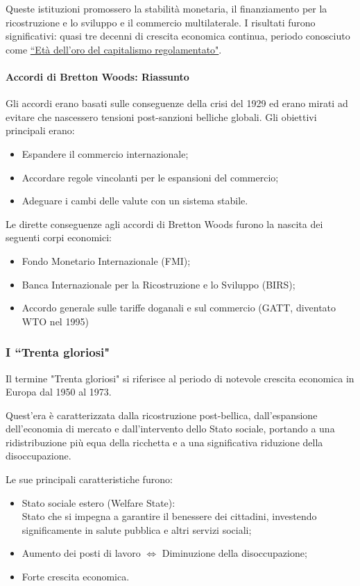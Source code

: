 \documentclass{article}
\begin{document}
Queste istituzioni promossero la stabilità monetaria, il finanziamento per la ricostruzione e
lo sviluppo e il commercio multilaterale. I risultati furono significativi:
quasi tre decenni di crescita economica continua, periodo conosciuto come 
\underline{``Età dell'oro del capitalismo regolamentato"}.

\paragraph{Accordi di Bretton Woods: Riassunto} \phantom{}

Gli accordi erano basati sulle conseguenze della crisi del 1929 ed erano mirati ad evitare che
nascessero tensioni post-sanzioni belliche globali. Gli obiettivi principali erano:
\begin{itemize}
    \item Espandere il commercio internazionale;
    \item Accordare regole vincolanti per le espansioni del commercio;
    \item Adeguare i cambi delle valute con un sistema stabile.
\end{itemize}

Le dirette conseguenze agli accordi di Bretton Woods furono la nascita dei seguenti corpi economici:
\begin{itemize}
    \item Fondo Monetario Internazionale (FMI);
    \item Banca Internazionale per la Ricostruzione e lo Sviluppo (BIRS);
    \item Accordo generale sulle tariffe doganali e sul commercio (GATT, diventato WTO nel 1995)
\end{itemize}

\subsubsection{I ``Trenta gloriosi"}
Il termine "Trenta gloriosi" si riferisce al periodo di notevole crescita economica in Europa
dal 1950 al 1973.

Quest'era è caratterizzata dalla ricostruzione post-bellica, dall'espansione dell'economia di
mercato e dall'intervento dello Stato sociale, portando a una ridistribuzione più equa della
ricchetta e a una significativa riduzione della disoccupazione. 

Le sue principali caratteristiche furono:
\begin{itemize}
    \item Stato sociale estero (Welfare State):\\ Stato che si impegna a garantire il benessere dei cittadini,
    investendo significamente in salute pubblica e altri servizi sociali;
    \item Aumento dei posti di lavoro $\Longleftrightarrow$ Diminuzione della disoccupazione;

    \item Forte crescita economica.
\end{itemize}
\end{document}
